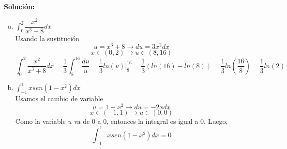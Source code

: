 \documentclass[12pt]{article}
\newenvironment{solucion}
{\begin{mdframed}[backgroundcolor=black!10]
		{\bf Solución:}\\
	}
	{
	\end{mdframed}
}
\newenvironment{preguntas}
{\begin{enumerate}\itemsep12pt
	}
	{
	\end{enumerate}
}
\newcommand{\ev}{\Big|}
\newcommand{\ra}{\rightarrow}
\begin{document}
\begin{preguntas}
\begin{solucion}
\begin{enumerate}[a)]
\item $\displaystyle\int_0^2 \dfrac{x^2}{x^3+8} dx$\\
			Usando la sustitución
			$$u=x^3+8 \ra du =  3x^2dx$$
			$$x \in (0, 2) \ra u \in (8, 16)$$
			$$\displaystyle\int_0^2 \dfrac{x^2}{x^3+8}dx = \dfrac{1}{3}\displaystyle\int_8^{16} \dfrac{du}{u} = \dfrac{1}{3}ln(u) \ev_8^{16} = \dfrac{1}{3}(ln(16)-ln(8)) = \dfrac{1}{3}ln\left(\dfrac{16}{8}\right) = \dfrac{1}{3}ln(2)$$
\item $\displaystyle\int_{-1}^1 xsen(1-x^2)dx$\\
			Usamos el cambio de variable
			$$u = 1-x^2 \ra du = -2xdx$$
			$$x \in (-1, 1) \ra u \in (0, 0)$$
			Como la variable $u$ va de 0 a 0, entonces la integral es igual a 0. Luego,
			$$\displaystyle\int_{-1}^1 xsen(1-x^2)dx = 0$$
\end{enumerate}
\end{solucion}
\end{preguntas}
\end{document}
